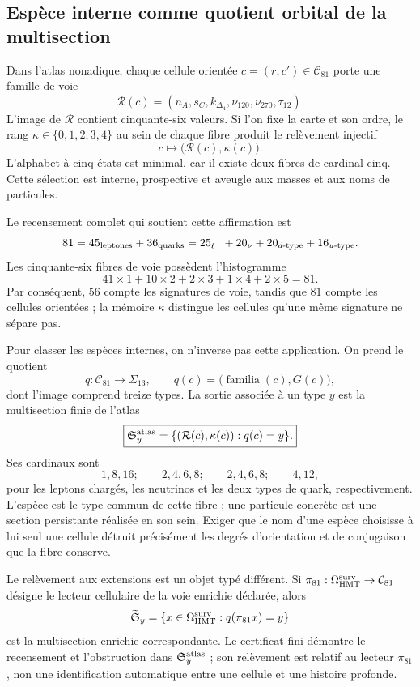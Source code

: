 \subsection{Espèce interne comme quotient orbital de la multisection}

Dans l'atlas nonadique, chaque cellule orientée \(c=(r,c')\in\mathcal C_{81}\)
porte une famille de voie
\[
 \mathcal R(c)=
 (n_A,s_C,k_{\Delta_4},\nu_{120},\nu_{270},\tau_{12}).
\]
L'image de \(\mathcal R\) contient cinquante-six valeurs. Si l'on fixe la
carte et son ordre, le rang \(\kappa\in\{0,1,2,3,4\}\) au sein de chaque fibre
produit le relèvement injectif
\[
 c\longmapsto \bigl(\mathcal R(c),\kappa(c)\bigr).
\]
L'alphabet à cinq états est minimal, car il existe deux fibres de
cardinal cinq. Cette sélection est interne, prospective et aveugle aux masses et aux
noms de particules.

Le recensement complet qui soutient cette affirmation est
\[
 81=45_{\rm leptones}+36_{\rm quarks}
   =25_{\ell^-}+20_{\nu}+20_{d\text{-type}}+16_{u\text{-type}}.
\]
Les cinquante-six fibres de voie possèdent l'histogramme
\[
 41\times1+10\times2+2\times3+1\times4+2\times5=81.
\]
Par conséquent, \(56\) compte les signatures de voie, tandis que \(81\) compte les cellules
orientées ; la mémoire \(\kappa\) distingue les cellules qu'une même signature ne
sépare pas.

Pour classer les espèces internes, on n'inverse pas cette application. On prend le
quotient
\[
 q:\mathcal C_{81}\longrightarrow\Sigma_{13},
 \qquad
 q(c)=\bigl(\operatorname{familia}(c),G(c)\bigr),
\]
dont l'image comprend treize types. La sortie associée à un type \(y\) est la
multisection finie de l'atlas
\[
 \boxed{
 \mathfrak S_y^{\rm atlas}=
 \{(\mathcal R(c),\kappa(c)):q(c)=y\}.}
\]
Ses cardinaux sont
\[
 1,8,16;\qquad 2,4,6,8;\qquad 2,4,6,8;\qquad4,12,
\]
pour les leptons chargés, les neutrinos et les deux types de quark,
respectivement. L'espèce est le type commun de cette fibre ; une particule
concrète est une section persistante réalisée en son sein. Exiger que le
nom d'une espèce choisisse à lui seul une cellule détruit précisément les
degrés d'orientation et de conjugaison que la fibre conserve.

Le relèvement aux extensions est un objet typé différent. Si
\(\pi_{81}:\Omega_{\rm HMT}^{\rm surv}\to\mathcal C_{81}\) désigne le lecteur
cellulaire de la voie enrichie déclarée, alors
\[
 \widetilde{\mathfrak S}_y
 =\{x\in\Omega_{\rm HMT}^{\rm surv}:q(\pi_{81}x)=y\}
\]
est la multisection enrichie correspondante. Le certificat fini
démontre le recensement et l'obstruction dans
\(\mathfrak S_y^{\rm atlas}\) ; son relèvement est relatif au lecteur
\(\pi_{81}\), non une identification automatique entre une cellule et une
histoire profonde.

